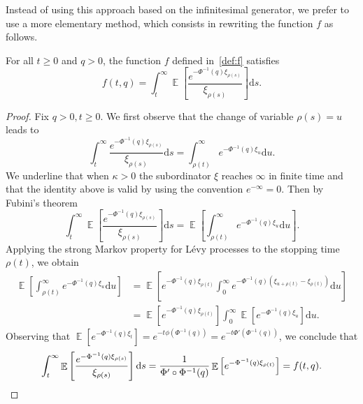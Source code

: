 \documentclass[AHL,Unicode,longabstracts,published]{cedram}
\DeclareMathOperator{\E}{\mathbb{E}}
\newcommand{\dd}{\mathrm{d}}
\begin{document}
Instead of using this approach based on the infinitesimal generator, we prefer to use a more elementary method, which consists in rewriting the function $f$ as follows.
\begin{lemm}\label{lem:rewritten}
For all $t \geq 0$ and $q > 0$, the function $f$ defined in~\eqref{def:f} satisfies
\[
f(t,q) = \int_t^\infty \E\left[\frac{e^{-\Phi^{-1}(q)\xi_{\rho(s)}}}{\xi_{\rho(s)}} \right] \dd s.
\]
\end{lemm}


\begin{proof}
Fix $q>0, t \geq 0$.
We first observe that the change of variable $\rho(s) = u$ leads to
\[
\int_t^\infty \frac{e^{-\Phi^{-1}(q) \xi_{\rho(s)}}}{\xi_{\rho(s)}} \dd s = \int_{\rho(t)}^{\infty} e^{-\Phi^{-1}(q) \xi_u} \dd u.
\]
We underline that when $\kappa > 0$ the subordinator $\xi$ reaches $\infty$ in finite time and that the identity above is valid by using the convention $e^{-\infty} = 0$. Then by Fubini's theorem
\[
\int_t^\infty \E\left[\frac{e^{-\Phi^{-1}(q)\xi_{\rho(s)}}}{\xi_{\rho(s)}} \right] \dd s =
\E\left[\int_{\rho(t)}^{\infty} e^{-\Phi^{-1}(q) \xi_u} \dd u \right].
\]
Applying the strong Markov property for Lévy processes to the stopping time $\rho(t)$, we obtain
\begin{align*}
\E\left[\int_{\rho(t)}^{\infty} e^{-\Phi^{-1}(q) \xi_u} \dd u \right] &= \E\left[e^{-\Phi^{-1}(q) \xi_{\rho(t)}} \int_0^{\infty} e^{-\Phi^{-1}(q) \left(\xi_{u +\rho(t)} - \xi_{\rho(t)}\right)} \dd u \right]\\
&= \E\left[e^{-\Phi^{-1}(q) \xi_{\rho(t)}} \right] \int_0^\infty \E\left[e^{-\Phi^{-1}(q) \xi_{u}} \right] \dd u.
\end{align*}
Observing that $\E[e^{- \Phi^{-1}(q) \xi_t}] = e^{-t \phi(\Phi^{-1}(q))}=e^{-t \Phi'(\Phi^{-1}(q))}$, we conclude that
\[
\int_t^\infty \E\left[\frac{e^{-\Phi^{-1}(q)\xi_{\rho(s)}}}{\xi_{\rho(s)}} \right] \dd s = \frac{1}{\Phi' \circ \Phi^{-1}(q)}\E\left[e^{-\Phi^{-1}(q) \xi_{\rho(t)}} \right] = f(t,q). \qedhere
\]
\end{proof}
\end{document}
